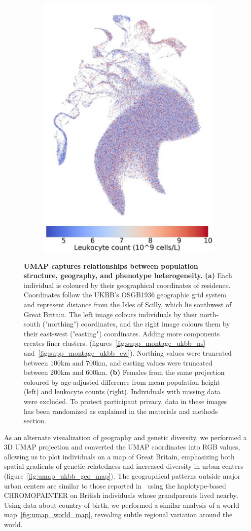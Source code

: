 \documentclass[12pt]{pnas-new}
\begin{document}
\begin{figure}
\begin{subfigure}{\columnwidth}
    \includegraphics[width=.4\columnwidth]{images/UKBB_UMAP_PC10_NN15_MD05_2018328174511_201871416519_leukocyte_count_pct5_f.pdf}
   \caption{}
    \label{fig:umap_height_female}
      \end{subfigure}
      \caption{\textbf{UMAP captures relationships between population structure, geography, and phenotype heterogeneity.} \textbf{(a)} Each individual is coloured by their geographical coordinates of residence. Coordinates follow the UKBB's OSGB1936 geographic grid system and represent distance from the Isles of Scilly, which lie southwest of Great Britain. The left image colours individuals by their north-south ("northing") coordinates, and the right image colours them by their east-west ("easting") coordinates. Adding more components creates finer clusters.  (figures~\ref{fig:supp_montage_ukbb_ns} and~\ref{fig:supp_montage_ukbb_ew}). Northing values were truncated between $100$km and $700$km, and easting values were truncated between $200$km and $600$km. \textbf{(b)} Females from the same projection coloured by age-adjusted difference from mean population height (left) and leukocyte counts (right). Individuals with missing data were excluded. To protect participant privacy, data in these images has been randomized as explained in the materials and methods section.}
\end{figure}

As an alternate visualization of geography and genetic diversity, we performed a 3D UMAP projection and converted the UMAP coordinates into RGB values, allowing us to plot individuals on a map of Great Britain, emphasizing both spatial gradients of genetic relatedness and increased diversity in urban centers (figure~\ref{fig:umap_ukbb_geo_map}). The geographical patterns outside major urban centers are similar to those reported in~\cite{leslie2015fine} using the haplotype-based CHROMOPAINTER on British individuals whose grandparents lived nearby. Using data about country of birth, we performed a similar analysis of a world map~\ref{fig:umap_world_map}, revealing subtle regional variation around the world. 
\end{document}
